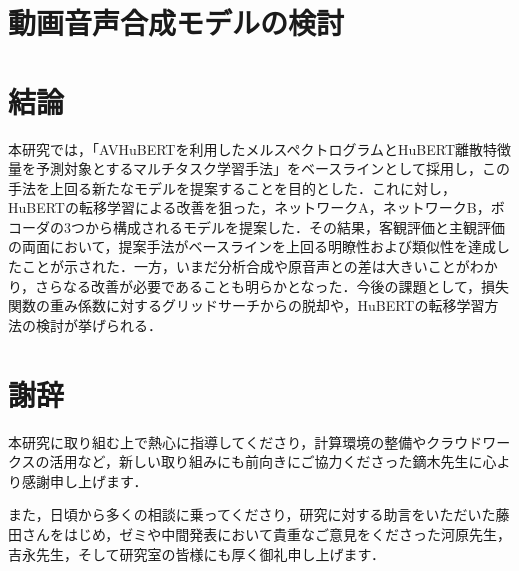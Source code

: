 \documentclass[12pt]{jarticle}
\numberwithin{equation}{section}    %
\numberwithin{figure}{section}      %
\numberwithin{table}{section}      %
\begin{document}
\clearpage

\section{動画音声合成モデルの検討}





\clearpage

\section{結論}
本研究では，「AVHuBERTを利用したメルスペクトログラムとHuBERT離散特徴量を予測対象とするマルチタスク学習手法」をベースラインとして採用し，この手法を上回る新たなモデルを提案することを目的とした．これに対し，HuBERTの転移学習による改善を狙った，ネットワークA，ネットワークB，ボコーダの3つから構成されるモデルを提案した．その結果，客観評価と主観評価の両面において，提案手法がベースラインを上回る明瞭性および類似性を達成したことが示された．一方，いまだ分析合成や原音声との差は大きいことがわかり，さらなる改善が必要であることも明らかとなった．今後の課題として，損失関数の重み係数に対するグリッドサーチからの脱却や，HuBERTの転移学習方法の検討が挙げられる．

\clearpage

\section*{謝辞}
本研究に取り組む上で熱心に指導してくださり，計算環境の整備やクラウドワークスの活用など，新しい取り組みにも前向きにご協力くださった鏑木先生に心より感謝申し上げます．

また，日頃から多くの相談に乗ってくださり，研究に対する助言をいただいた藤田さんをはじめ，ゼミや中間発表において貴重なご意見をくださった河原先生，吉永先生，そして研究室の皆様にも厚く御礼申し上げます．

\clearpage



\end{document}
